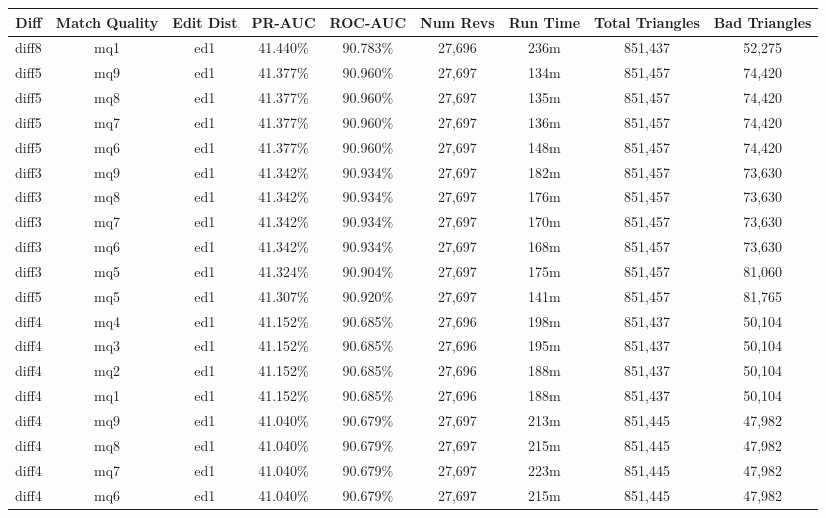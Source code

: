 \begin{sidewaystable}[!ph]
  \begin{center}
    \begin{tabular}{|c|c|c||c|c||c|c|c|c|}
\hline
Diff & Match Quality & Edit Dist
        & PR-AUC & ROC-AUC
        & Num Revs & Run Time
        & Total Triangles & Bad Triangles \\
\hline
\hline
diff8 & mq1 & ed1 & 41.440\% & 90.783\% & 27,696 & 236m & 851,437 & 52,275 \\
diff5 & mq9 & ed1 & 41.377\% & 90.960\% & 27,697 & 134m & 851,457 & 74,420 \\
diff5 & mq8 & ed1 & 41.377\% & 90.960\% & 27,697 & 135m & 851,457 & 74,420 \\
diff5 & mq7 & ed1 & 41.377\% & 90.960\% & 27,697 & 136m & 851,457 & 74,420 \\
diff5 & mq6 & ed1 & 41.377\% & 90.960\% & 27,697 & 148m & 851,457 & 74,420 \\
diff3 & mq9 & ed1 & 41.342\% & 90.934\% & 27,697 & 182m & 851,457 & 73,630 \\
diff3 & mq8 & ed1 & 41.342\% & 90.934\% & 27,697 & 176m & 851,457 & 73,630 \\
diff3 & mq7 & ed1 & 41.342\% & 90.934\% & 27,697 & 170m & 851,457 & 73,630 \\
diff3 & mq6 & ed1 & 41.342\% & 90.934\% & 27,697 & 168m & 851,457 & 73,630 \\
diff3 & mq5 & ed1 & 41.324\% & 90.904\% & 27,697 & 175m & 851,457 & 81,060 \\
diff5 & mq5 & ed1 & 41.307\% & 90.920\% & 27,697 & 141m & 851,457 & 81,765 \\
diff4 & mq4 & ed1 & 41.152\% & 90.685\% & 27,696 & 198m & 851,437 & 50,104 \\
diff4 & mq3 & ed1 & 41.152\% & 90.685\% & 27,696 & 195m & 851,437 & 50,104 \\
diff4 & mq2 & ed1 & 41.152\% & 90.685\% & 27,696 & 188m & 851,437 & 50,104 \\
diff4 & mq1 & ed1 & 41.152\% & 90.685\% & 27,696 & 188m & 851,437 & 50,104 \\
diff4 & mq9 & ed1 & 41.040\% & 90.679\% & 27,697 & 213m & 851,445 & 47,982 \\
diff4 & mq8 & ed1 & 41.040\% & 90.679\% & 27,697 & 215m & 851,445 & 47,982 \\
diff4 & mq7 & ed1 & 41.040\% & 90.679\% & 27,697 & 223m & 851,445 & 47,982 \\
diff4 & mq6 & ed1 & 41.040\% & 90.679\% & 27,697 & 215m & 851,445 & 47,982 \\

\end{tabular}
\end{center}
\end{sidewaystable}
